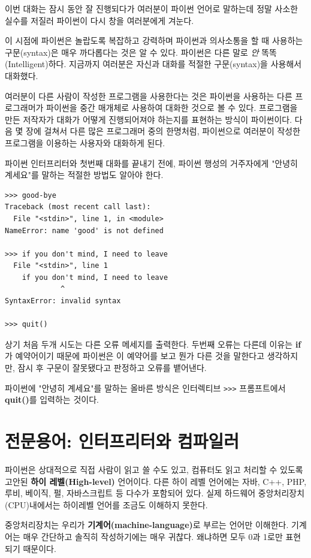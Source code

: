이번 대화는 잠시 동안 잘 진행되다가 여러분이 파이썬 언어로 말하는데 정말 사소한 실수를 저질러 파이썬이 다시 창을 여러분에게 겨눈다.

이 시점에 파이썬은 놀랍도록 복잡하고 강력하며 파이썬과 의사소통을 할 때 사용하는 구문(syntax)은 매우 까다롭다는 것은 알 수 있다. 
파이썬은 다른 말로 \emph{안} 똑똑(Intelligent)하다. 지금까지 여러분은 자신과 대화를 적절한 구문(syntax)을 사용해서 대화했다.

여러분이 다른 사람이 작성한 프로그램을 사용한다는 것은 
파이썬을 사용하는 다른 프로그래머가 파이썬을 중간 매개체로 사용하여 대화한 것으로 볼 수 있다. 
프로그램을 만든 저작자가 대화가 어떻게 진행되어져야 하는지를 표현하는 방식이 파이썬이다. 
다음 몇 장에 걸쳐서 다른 많은 프로그래머 중의 한명처럼, 파이썬으로 여러분이 작성한 프로그램을 이용하는 사용자와 대화하게 된다. 

파이썬 인터프리터와 첫번째 대화를 끝내기 전에, 파이썬 행성의 거주자에게 "안녕히 계세요"를 말하는 적절한 방법도 알아야 한다.

\beforeverb
\begin{verbatim}
>>> good-bye
Traceback (most recent call last):
  File "<stdin>", line 1, in <module>
NameError: name 'good' is not defined

>>> if you don't mind, I need to leave
  File "<stdin>", line 1
    if you don't mind, I need to leave
             ^
SyntaxError: invalid syntax

>>> quit()
\end{verbatim}
\afterverb
%
상기 처음 두개 시도는 다른 오류 메세지를 출력한다. 
두번째 오류는 다른데 이유는 {\bf if}가 예약어이기 때문에 파이썬은 이 예약어를 보고 뭔가 다른 것을 말한다고 생각하지만, 
잠시 후 구문이 잘못됐다고 판정하고 오류를 뱉어낸다.

파이썬에 "안녕히 계세요"를 말하는 올바른 방식은 인터렉티브 {\tt >>>} 프롬프트에서 {\bf quit()}를 입력하는 것이다.

\section{전문용어: 인터프리터와 컴파일러}

파이썬은 상대적으로 직접 사람이 읽고 쓸 수도 있고, 컴퓨터도 읽고 처리할 수 있도록 고안된 {\bf 하이 레벨(High-level)} 언어이다. 
다른 하이 레벨 언어에는 자바, C++, PHP, 루비, 베이직, 펄, 자바스크립트 등 다수가 포함되어 있다. 
실제 하드웨어 중앙처리장치(CPU)내에서는 하이레벨 언어를 조금도 이해하지 못한다.

중앙처리장치는 우리가 {\bf 기계어(machine-language)}로 부르는 언어만 이해한다. 
기계어는 매우 간단하고 솔직히 작성하기에는 매우 귀찮다. 
왜냐하면 모두 0과 1로만 표현되기 때문이다.

